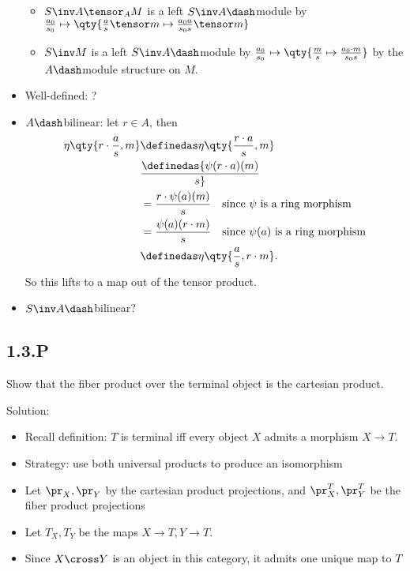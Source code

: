 \begin{itemize}
  \begin{itemize}
  \tightlist
  \item
    \(S\inv A \tensor_A M\) is a left \(S\inv A\dash\)module by
    \({a_0\over s_0} \mapsto \qty{ {a\over s}\tensor m \mapsto {a_0 a \over s_0 s} \tensor m }\)
  \item
    \(S\inv M\) is a left \(S\inv A\dash\)module by
    \({a_0\over s_0} \mapsto \qty{{m \over s} \mapsto {a_0 \cdot m \over s_0 s} }\)
    by the \(A\dash\)module structure on \(M\).
  \end{itemize}
\item
  Well-defined: ?
\item
  \(A\dash\)bilinear: let \(r\in A\), then \begin{align*}
  \eta\qty{r \cdot {a\over s}, m} 
  &\definedas \eta\qty{{r\cdot a\over s}, m}  \\
  &\definedas {\psi(r\cdot a)(m) \over s} \\
  &= {r\cdot \psi(a)(m) \over s} \quad\text{since $\psi$ is a ring morphism} \\
  &= {\psi(a)(r\cdot m) \over s} \quad\text{since $\psi(a)$ is a ring morphism} \\
  &\definedas \eta\qty{ {a\over s}, r\cdot m}
   .\end{align*} So this lifts to a map out of the tensor product.
\item
  \(S\inv A\dash\)bilinear?
\end{itemize}

\hypertarget{p}{%
\subsection{1.3.P}\label{p}}

Show that the fiber product over the terminal object is the cartesian
product.

Solution:

\begin{itemize}
\tightlist
\item
  Recall definition: \(T\) is terminal iff every object \(X\) admits a
  morphism \(X\to T\).
\item
  Strategy: use both universal products to produce an isomorphism
\item
  Let \(\pr_X, \pr_Y\) by the cartesian product projections, and
  \(\pr_X^T, \pr_Y^T\) be the fiber product projections
\item
  Let \(T_X, T_Y\) be the maps \(X\to T, Y\to T\).
\item
  Since \(X\cross Y\) is an object in this category, it admits one
  unique map to \(T\)
\end{itemize}

